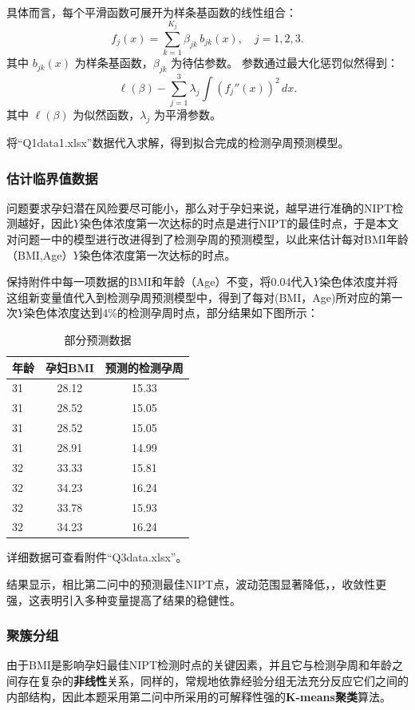 \documentclass[12pt]{ctexart}
\begin{document}
	具体而言，每个平滑函数可展开为样条基函数的线性组合：
	\begin{equation}
		f_j(x) = \sum_{k=1}^{K_j} \beta_{jk}\, b_{jk}(x), \quad j=1,2,3.
	\end{equation}
	其中 $b_{jk}(x)$ 为样条基函数，$\beta_{jk}$ 为待估参数。
	参数通过最大化惩罚似然得到：
	\begin{equation}
		\ell(\beta) - \sum_{j=1}^3 \lambda_j \int \left(f_j''(x)\right)^2 \, dx.
	\end{equation}
	其中 $\ell(\beta)$ 为似然函数，$\lambda_j$ 为平滑参数。
	
	将“Q1data1.xlsx”数据代入求解，得到拟合完成的检测孕周预测模型。
	\subsubsection{估计临界值数据}
	问题要求孕妇潜在风险要尽可能小，那么对于孕妇来说，越早进行准确的NIPT检测越好，因此$Y$染色体浓度第一次达标的时点是进行NIPT的最佳时点，于是本文对问题一中的模型进行改进得到了检测孕周的预测模型，以此来估计每对BMI年龄（BMI,Age）$Y$染色体浓度第一次达标的时点。
	
	保持附件中每一项数据的BMI和年龄（Age）不变，将0.04代入$Y$染色体浓度并将这组新变量值代入到检测孕周预测模型中，得到了每对(BMI，Age)所对应的第一次$Y$染色体浓度达到4\%的检测孕周时点，部分结果如下图所示：
	\begin{table}[htpb]
		\centering
		\caption{部分预测数据}
		\setlength{\tabcolsep}{14pt}
		\begin{tabular}{lcc}
			\toprule
			年龄 & 孕妇BMI & 预测的检测孕周 \\
			\midrule
			31 & 28.12 & 15.33 \\
			31 & 28.52 & 15.05 \\
			31 & 28.52 & 15.05 \\
			31 & 28.91 & 14.99 \\
			32 & 33.33 & 15.81 \\
			32 & 34.23 & 16.24 \\
			32 & 33.78 & 15.93 \\
			32 & 34.23 & 16.24 \\
			\bottomrule
		\end{tabular}
	\end{table}
	
	详细数据可查看附件“Q3data.xlsx”。
	
	结果显示，相比第二问中的预测最佳NIPT点，波动范围显著降低，，收敛性更强，这表明引入多种变量提高了结果的稳健性。
	\subsubsection{聚簇分组}
	由于BMI是影响孕妇最佳NIPT检测时点的关键因素，并且它与检测孕周和年龄之间存在复杂的\textbf{非线性}关系，同样的，常规地依靠经验分组无法充分反应它们之间的内部结构，因此本题采用第二问中所采用的可解释性强的\textbf{K-means聚类}算法。
	
\end{document}
